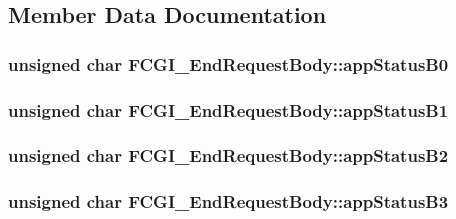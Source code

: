 \subsection{Member Data Documentation}
\hypertarget{structFCGI__EndRequestBody_a76d1d72eef07cfb6a40de1c3a5798cc1}{
\subsubsection[{app\-Status\-B0}]{\setlength{\rightskip}{0pt plus 5cm}unsigned char F\-C\-G\-I\-\_\-\-End\-Request\-Body\-::app\-Status\-B0}}\label{structFCGI__EndRequestBody_a76d1d72eef07cfb6a40de1c3a5798cc1}
\hypertarget{structFCGI__EndRequestBody_a99aade4e57e82b093002c404355ccce2}{
\subsubsection[{app\-Status\-B1}]{\setlength{\rightskip}{0pt plus 5cm}unsigned char F\-C\-G\-I\-\_\-\-End\-Request\-Body\-::app\-Status\-B1}}\label{structFCGI__EndRequestBody_a99aade4e57e82b093002c404355ccce2}
\hypertarget{structFCGI__EndRequestBody_a953e5f4a6aa806f227cd21d0899e0705}{
\subsubsection[{app\-Status\-B2}]{\setlength{\rightskip}{0pt plus 5cm}unsigned char F\-C\-G\-I\-\_\-\-End\-Request\-Body\-::app\-Status\-B2}}\label{structFCGI__EndRequestBody_a953e5f4a6aa806f227cd21d0899e0705}
\hypertarget{structFCGI__EndRequestBody_a91ec9fe7e3113e4fa46bfe4adace3f53}{
\subsubsection[{app\-Status\-B3}]{\setlength{\rightskip}{0pt plus 5cm}unsigned char F\-C\-G\-I\-\_\-\-End\-Request\-Body\-::app\-Status\-B3}}\label{structFCGI__EndRequestBody_a91ec9fe7e3113e4fa46bfe4adace3f53}
